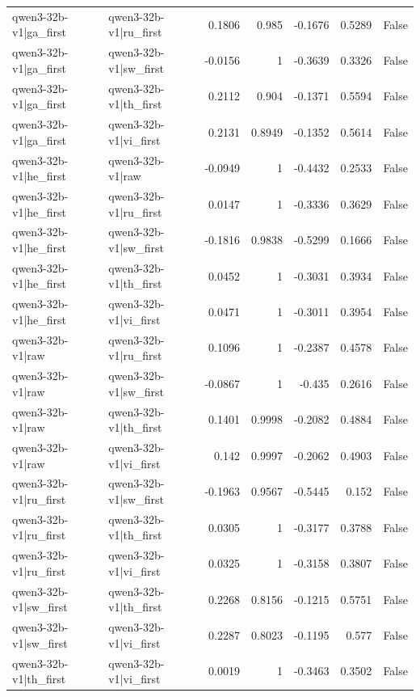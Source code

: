\begin{table}
\begin{tabular}{l l r r r r l}
qwen3-32b-v1|ga_first & qwen3-32b-v1|ru_first & 0.1806 & 0.985 & -0.1676 & 0.5289 & False \\
qwen3-32b-v1|ga_first & qwen3-32b-v1|sw_first & -0.0156 & 1 & -0.3639 & 0.3326 & False \\
qwen3-32b-v1|ga_first & qwen3-32b-v1|th_first & 0.2112 & 0.904 & -0.1371 & 0.5594 & False \\
qwen3-32b-v1|ga_first & qwen3-32b-v1|vi_first & 0.2131 & 0.8949 & -0.1352 & 0.5614 & False \\
qwen3-32b-v1|he_first & qwen3-32b-v1|raw & -0.0949 & 1 & -0.4432 & 0.2533 & False \\
qwen3-32b-v1|he_first & qwen3-32b-v1|ru_first & 0.0147 & 1 & -0.3336 & 0.3629 & False \\
qwen3-32b-v1|he_first & qwen3-32b-v1|sw_first & -0.1816 & 0.9838 & -0.5299 & 0.1666 & False \\
qwen3-32b-v1|he_first & qwen3-32b-v1|th_first & 0.0452 & 1 & -0.3031 & 0.3934 & False \\
qwen3-32b-v1|he_first & qwen3-32b-v1|vi_first & 0.0471 & 1 & -0.3011 & 0.3954 & False \\
qwen3-32b-v1|raw & qwen3-32b-v1|ru_first & 0.1096 & 1 & -0.2387 & 0.4578 & False \\
qwen3-32b-v1|raw & qwen3-32b-v1|sw_first & -0.0867 & 1 & -0.435 & 0.2616 & False \\
qwen3-32b-v1|raw & qwen3-32b-v1|th_first & 0.1401 & 0.9998 & -0.2082 & 0.4884 & False \\
qwen3-32b-v1|raw & qwen3-32b-v1|vi_first & 0.142 & 0.9997 & -0.2062 & 0.4903 & False \\
qwen3-32b-v1|ru_first & qwen3-32b-v1|sw_first & -0.1963 & 0.9567 & -0.5445 & 0.152 & False \\
qwen3-32b-v1|ru_first & qwen3-32b-v1|th_first & 0.0305 & 1 & -0.3177 & 0.3788 & False \\
qwen3-32b-v1|ru_first & qwen3-32b-v1|vi_first & 0.0325 & 1 & -0.3158 & 0.3807 & False \\
qwen3-32b-v1|sw_first & qwen3-32b-v1|th_first & 0.2268 & 0.8156 & -0.1215 & 0.5751 & False \\
qwen3-32b-v1|sw_first & qwen3-32b-v1|vi_first & 0.2287 & 0.8023 & -0.1195 & 0.577 & False \\
qwen3-32b-v1|th_first & qwen3-32b-v1|vi_first & 0.0019 & 1 & -0.3463 & 0.3502 & False \\
\bottomrule
\end{tabular}
\end{table}
